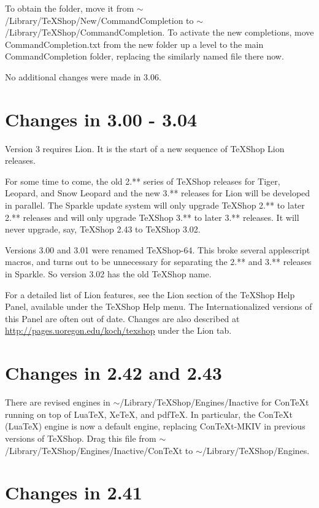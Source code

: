 \documentclass[11pt, oneside]{amsart}
\begin{document}
To obtain the folder, move it from $\sim$/Library/TeXShop/New/CommandCompletion to $\sim$/Library/TeXShop/CommandCompletion.
To activate the new completions, move CommandCompletion.txt from the new folder up a level to the main CommandCompletion
folder, replacing the similarly named file there now.

No additional changes were made in 3.06.

\section{Changes in 3.00 - 3.04}

Version 3 requires Lion. It is the start of a new sequence of TeXShop Lion releases. 

For some time to come, the old 2.** series of TeXShop releases for Tiger, Leopard, and Snow Leopard and the new 3.** releases for Lion
will be developed in parallel. The Sparkle update
system will only upgrade TeXShop 2.** to later 2.** releases and will only upgrade TeXShop 3.** to later 3.** releases. It will never upgrade, say, TeXShop 2.43 to
TeXShop 3.02.

Versions 3.00 and 3.01 were renamed TeXShop-64. This broke several applescript macros, and turns out to be unnecessary for separating the 2.** and 3.** releases in Sparkle. So version 3.02 has the old TeXShop name. 

For a detailed list of Lion features, see the Lion section of the TeXShop Help Panel, available under the TeXShop Help menu. The Internationalized versions of
this Panel are often out of date. Changes are also described at \url{http://pages.uoregon.edu/koch/texshop} under the Lion tab.

\section{Changes in 2.42 and 2.43}
There are revised engines in $\sim$/Library/TeXShop/Engines/Inactive for ConTeXt running on top of LuaTeX, XeTeX, and pdfTeX.
In particular, the ConTeXt (LuaTeX) engine is now a default engine, replacing ConTeXt-MKIV in previous versions of TeXShop. Drag this file
from $\sim$/Library/TeXShop/Engines/Inactive/ConTeXt to $\sim$/Library/TeXShop/Engines.



\section{Changes in 2.41}
\end{document}
